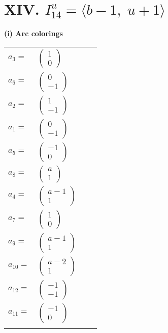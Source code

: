 \documentclass[1p]{elsarticle_modified}
\theoremstyle{definition}
\begin{document}
\centering \section*{XIV. $I^u_{14}= \langle b-1,\;u+1 \rangle$}
\flushleft \textbf{(i) Arc colorings}\\
\begin{tabular}{m{7pt} m{180pt} m{7pt} m{180pt} }
\flushright $a_{3}=$&$\begin{pmatrix}1\\0\end{pmatrix}$ \\
\flushright $a_{6}=$&$\begin{pmatrix}0\\-1\end{pmatrix}$ \\
\flushright $a_{2}=$&$\begin{pmatrix}1\\-1\end{pmatrix}$ \\
\flushright $a_{1}=$&$\begin{pmatrix}0\\-1\end{pmatrix}$ \\
\flushright $a_{5}=$&$\begin{pmatrix}-1\\0\end{pmatrix}$ \\
\flushright $a_{8}=$&$\begin{pmatrix}a\\1\end{pmatrix}$ \\
\flushright $a_{4}=$&$\begin{pmatrix}a-1\\1\end{pmatrix}$ \\
\flushright $a_{7}=$&$\begin{pmatrix}1\\0\end{pmatrix}$ \\
\flushright $a_{9}=$&$\begin{pmatrix}a-1\\1\end{pmatrix}$ \\
\flushright $a_{10}=$&$\begin{pmatrix}a-2\\1\end{pmatrix}$ \\
\flushright $a_{12}=$&$\begin{pmatrix}-1\\-1\end{pmatrix}$ \\
\flushright $a_{11}=$&$\begin{pmatrix}-1\\0\end{pmatrix}$\\&\end{tabular}
\end{document}
